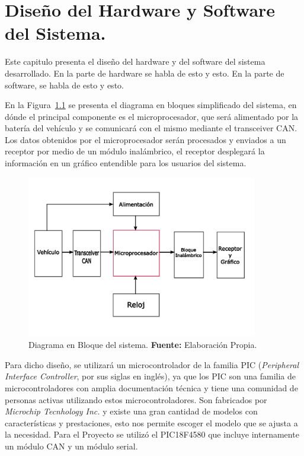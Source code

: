 \chapter[Diseño del Hardware y Software del Sistema]{Diseño del Hardware y Software del Sistema.}

Este capitulo presenta el diseño del hardware y del software del sistema desarrollado. En la parte de hardware se habla de esto y esto. En la parte de software, se habla de esto y esto.

En la Figura~\ref{fig_bloque_c4} se presenta el diagrama en bloques simplificado del sistema, en dónde el principal componente es el microprocesador, que será alimentado por la batería del vehículo y se comunicará con el mismo mediante el transceiver CAN.  
Los datos obtenidos por el microprocesador serán procesados y enviados a un receptor por medio de un módulo inalámbrico, el receptor desplegará la información en un gráfico entendible para los usuarios del sistema. 
\begin{figure}[H]
	\centering
		\includegraphics[width=0.9\textwidth]{./Cap4imagen/bloqueHardware.pdf}
	\caption[Diagrama en Bloque del sistema.]{Diagrama en Bloque del sistema.\textbf{ Fuente:}  Elaboración Propia.}
	\label{fig_bloque_c4} %
\end{figure}



Para dicho diseño, se utilizará un microcontrolador de la familia PIC (\textit{Peripheral Interface Controller}, por sus siglas en inglés), ya que los PIC son una familia de microcontroladores con amplia documentación técnica y tiene una comunidad de personas activas utilizando estos microcontroladores. 
Son fabricados por \textit{Microchip Tecnhology Inc.} y existe una gran cantidad de modelos con características y prestaciones, esto nos permite escoger el modelo que se ajusta a la necesidad. 
Para el Proyecto se utilizó el PIC18F4580 que incluye internamente un módulo CAN y un módulo serial. 


